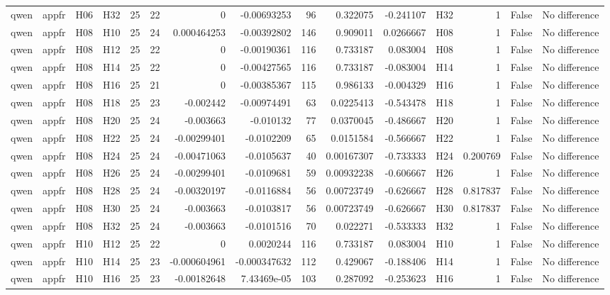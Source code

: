 \begin{longtable}{llllrrrrrrrlrrl}
qwen & appfr & H06 & H32 & 25 & 22 & 0 & -0.00693253 & 96 & 0.322075 & -0.241107 & H32 & 1 & False & No difference \\
qwen & appfr & H08 & H10 & 25 & 24 & 0.000464253 & -0.00392802 & 146 & 0.909011 & 0.0266667 & H08 & 1 & False & No difference \\
qwen & appfr & H08 & H12 & 25 & 22 & 0 & -0.00190361 & 116 & 0.733187 & 0.083004 & H08 & 1 & False & No difference \\
qwen & appfr & H08 & H14 & 25 & 22 & 0 & -0.00427565 & 116 & 0.733187 & -0.083004 & H14 & 1 & False & No difference \\
qwen & appfr & H08 & H16 & 25 & 21 & 0 & -0.00385367 & 115 & 0.986133 & -0.004329 & H16 & 1 & False & No difference \\
qwen & appfr & H08 & H18 & 25 & 23 & -0.002442 & -0.00974491 & 63 & 0.0225413 & -0.543478 & H18 & 1 & False & No difference \\
qwen & appfr & H08 & H20 & 25 & 24 & -0.003663 & -0.010132 & 77 & 0.0370045 & -0.486667 & H20 & 1 & False & No difference \\
qwen & appfr & H08 & H22 & 25 & 24 & -0.00299401 & -0.0102209 & 65 & 0.0151584 & -0.566667 & H22 & 1 & False & No difference \\
qwen & appfr & H08 & H24 & 25 & 24 & -0.00471063 & -0.0105637 & 40 & 0.00167307 & -0.733333 & H24 & 0.200769 & False & No difference \\
qwen & appfr & H08 & H26 & 25 & 24 & -0.00299401 & -0.0109681 & 59 & 0.00932238 & -0.606667 & H26 & 1 & False & No difference \\
qwen & appfr & H08 & H28 & 25 & 24 & -0.00320197 & -0.0116884 & 56 & 0.00723749 & -0.626667 & H28 & 0.817837 & False & No difference \\
qwen & appfr & H08 & H30 & 25 & 24 & -0.003663 & -0.0103817 & 56 & 0.00723749 & -0.626667 & H30 & 0.817837 & False & No difference \\
qwen & appfr & H08 & H32 & 25 & 24 & -0.003663 & -0.0101516 & 70 & 0.022271 & -0.533333 & H32 & 1 & False & No difference \\
qwen & appfr & H10 & H12 & 25 & 22 & 0 & 0.0020244 & 116 & 0.733187 & 0.083004 & H10 & 1 & False & No difference \\
qwen & appfr & H10 & H14 & 25 & 23 & -0.000604961 & -0.000347632 & 112 & 0.429067 & -0.188406 & H14 & 1 & False & No difference \\
qwen & appfr & H10 & H16 & 25 & 23 & -0.00182648 & 7.43469e-05 & 103 & 0.287092 & -0.253623 & H16 & 1 & False & No difference \\

\end{longtable}

